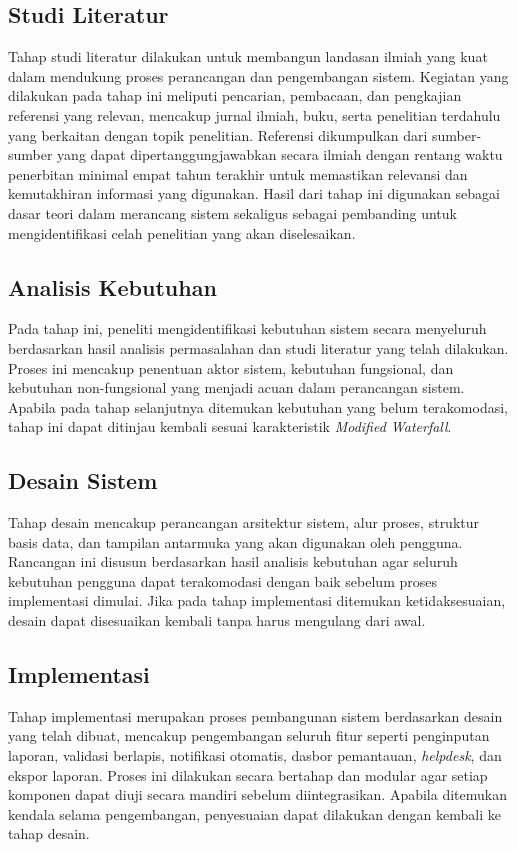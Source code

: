 \subsection{Studi Literatur} \label{III.StudiLiteratur}
Tahap studi literatur dilakukan untuk membangun landasan ilmiah yang kuat dalam mendukung proses perancangan dan pengembangan sistem. Kegiatan yang dilakukan pada tahap ini meliputi pencarian, pembacaan, dan pengkajian referensi yang relevan, mencakup jurnal ilmiah, buku, serta penelitian terdahulu yang berkaitan dengan topik penelitian. Referensi dikumpulkan dari sumber-sumber yang dapat dipertanggungjawabkan secara ilmiah dengan rentang waktu penerbitan minimal empat tahun terakhir untuk memastikan relevansi dan kemutakhiran informasi yang digunakan. Hasil dari tahap ini digunakan sebagai dasar teori dalam merancang sistem sekaligus sebagai pembanding untuk mengidentifikasi celah penelitian yang akan diselesaikan. \par

\subsection{Analisis Kebutuhan} \label{III.AnalisisKebutuhan}
Pada tahap ini, peneliti mengidentifikasi kebutuhan sistem secara menyeluruh berdasarkan hasil analisis permasalahan dan studi literatur yang telah dilakukan. Proses ini mencakup penentuan aktor sistem, kebutuhan fungsional, dan kebutuhan non-fungsional yang menjadi acuan dalam perancangan sistem. Apabila pada tahap selanjutnya ditemukan kebutuhan yang belum terakomodasi, tahap ini dapat ditinjau kembali sesuai karakteristik \textit{Modified Waterfall}. \par

\subsection{Desain Sistem} \label{III.DesainSistem}
Tahap desain mencakup perancangan arsitektur sistem, alur proses, struktur basis data, dan tampilan antarmuka yang akan digunakan oleh pengguna. Rancangan ini disusun berdasarkan hasil analisis kebutuhan agar seluruh kebutuhan pengguna dapat terakomodasi dengan baik sebelum proses implementasi dimulai. Jika pada tahap implementasi ditemukan ketidaksesuaian, desain dapat disesuaikan kembali tanpa harus mengulang dari awal. \par

\subsection{Implementasi} \label{III.Implementasi}
Tahap implementasi merupakan proses pembangunan sistem berdasarkan desain yang telah dibuat, mencakup pengembangan seluruh fitur seperti penginputan laporan, validasi berlapis, notifikasi otomatis, dasbor pemantauan, \textit{helpdesk}, dan ekspor laporan. Proses ini dilakukan secara bertahap dan modular agar setiap komponen dapat diuji secara mandiri sebelum diintegrasikan. Apabila ditemukan kendala selama pengembangan, penyesuaian dapat dilakukan dengan kembali ke tahap desain. \par

